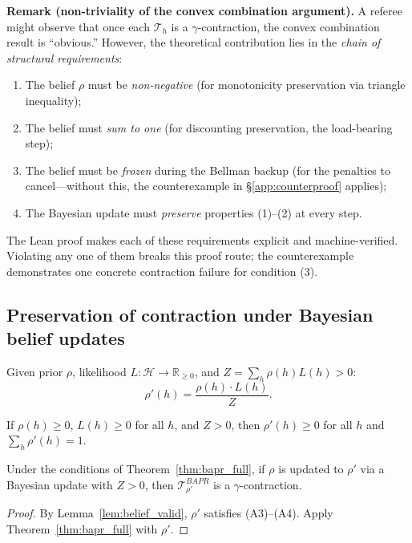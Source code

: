 \medskip
\noindent\textbf{Remark (non-triviality of the convex combination argument).}
A referee might observe that once each $\mathcal{T}_h$ is a $\gamma$-contraction, the convex combination result is ``obvious.'' However, the theoretical contribution lies in the \emph{chain of structural requirements}:
\begin{enumerate}
    \item The belief $\rho$ must be \emph{non-negative} (for monotonicity preservation via triangle inequality);
    \item The belief must \emph{sum to one} (for discounting preservation, the load-bearing step);
    \item The belief must be \emph{frozen} during the Bellman backup (for the penalties to cancel---without this, the counterexample in \S\ref{app:counterproof} applies);
    \item The Bayesian update must \emph{preserve} properties (1)--(2) at every step.
\end{enumerate}
The Lean proof makes each of these requirements explicit and machine-verified. Violating any one of them breaks this proof route; the counterexample demonstrates one concrete contraction failure for condition (3).


\subsection{Preservation of contraction under Bayesian belief updates}

\begin{definition}
    Given prior $\rho$, likelihood $L: \mathcal{H} \to \mathbb{R}_{\geq 0}$, and $Z = \sum_h \rho(h) L(h) > 0$:
    \begin{equation}
        \rho'(h) = \frac{\rho(h) \cdot L(h)}{Z}.
    \end{equation}
\end{definition}

\begin{lemma}
    \label{lem:belief_valid}
    If $\rho(h) \geq 0$, $L(h) \geq 0$ for all $h$, and $Z > 0$, then $\rho'(h) \geq 0$ for all $h$ and $\sum_h \rho'(h) = 1$.
\end{lemma}

\begin{corollary}
    \label{cor:after_update}
    Under the conditions of Theorem~\ref{thm:bapr_full}, if $\rho$ is updated to $\rho'$ via a Bayesian update with $Z > 0$, then $\mathcal{T}^{BAPR}_{\rho'}$ is a $\gamma$-contraction.
\end{corollary}
\begin{proof}
By Lemma~\ref{lem:belief_valid}, $\rho'$ satisfies (A3)--(A4). Apply Theorem~\ref{thm:bapr_full} with $\rho'$.
\end{proof}

